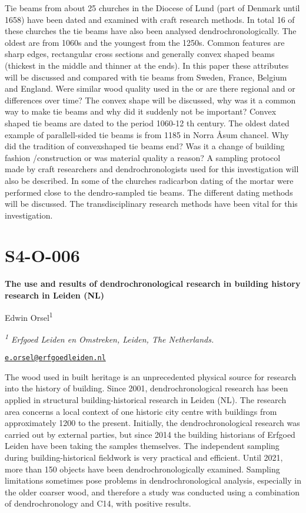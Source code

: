 \documentclass[
]{book}
\begin{document}
Tie beams from about 25 churches in the Diocese of Lund (part of Denmark until 1658) have been dated and examined with craft research methods. In total 16 of these churches the tie beams have also been analysed dendrochronologically. The oldest are from 1060s and the youngest from the 1250s. Common features are sharp edges, rectangular cross sections and generally convex shaped beams (thickest in the middle and thinner at the ends). In this paper these attributes will be discussed and compared with tie beams from Sweden, France, Belgium and England. Were similar wood quality used in the or are there regional and or differences over time? The convex shape will be discussed, why was it a common way to make tie beams and why did it suddenly not be important? Convex shaped tie beams are dated to the period 1060-12 th century. The oldest dated example of parallell-sided tie beams is from 1185 in Norra Åsum chancel. Why did the tradition of convexshaped tie beams end? Was it a change of building fashion /construction or was material quality a reason? A sampling protocol made by craft researchers and dendrochronologists used for this investigation will also be described. In some of the churches radicarbon dating of the mortar were performed close to the dendro-sampled tie beams. The different dating methods will be discussed. The transdisciplinary research methods have been vital for this investigation.

\hypertarget{s4-o-006}{%
\section*{S4-O-006}\label{s4-o-006}}

\textbf{The use and results of dendrochronological research in building history research in Leiden (NL)}

Edwin Orsel\textsuperscript{1}

\emph{\textsuperscript{1} Erfgoed Leiden en Omstreken, Leiden, The Netherlands.}

\href{mailto:e.orsel@erfgoedleiden.nl}{\nolinkurl{e.orsel@erfgoedleiden.nl}}

The wood used in built heritage is an unprecedented physical source for research into the history of building. Since 2001, dendrochronological research has been applied in structural building-historical research in Leiden (NL). The research area concerns a local context of one historic city centre with buildings from approximately 1200 to the present. Initially, the dendrochronological research was carried out by external parties, but since 2014 the building historians of Erfgoed Leiden have been taking the samples themselves. The independent sampling during building-historical fieldwork is very practical and efficient. Until 2021, more than 150 objects have been dendrochronologically examined. Sampling limitations sometimes pose problems in dendrochronological analysis, especially in the older coarser wood, and therefore a study was conducted using a combination of dendrochronology and C14, with positive results.
\end{document}
